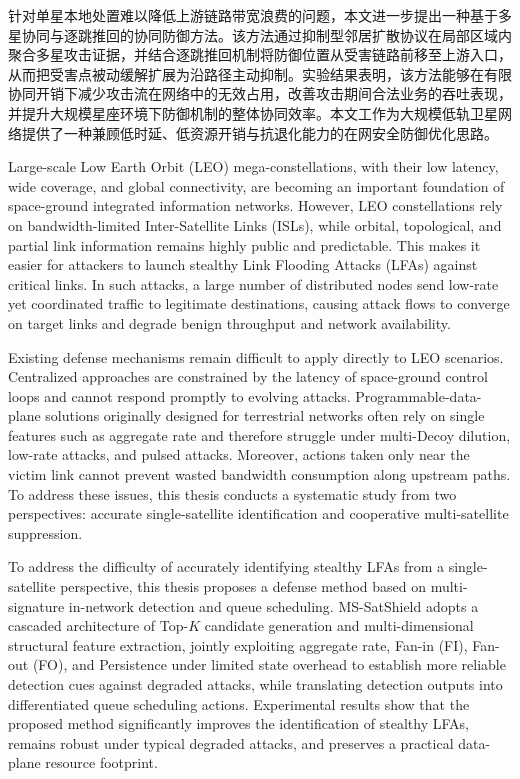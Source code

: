 \documentclass[print, master, vlined]{DissertUESTC}
\begin{document}
	针对单星本地处置难以降低上游链路带宽浪费的问题，本文进一步提出一种基于多星协同与逐跳推回的协同防御方法。该方法通过抑制型邻居扩散协议在局部区域内聚合多星攻击证据，并结合逐跳推回机制将防御位置从受害链路前移至上游入口，从而把受害点被动缓解扩展为沿路径主动抑制。实验结果表明，该方法能够在有限协同开销下减少攻击流在网络中的无效占用，改善攻击期间合法业务的吞吐表现，并提升大规模星座环境下防御机制的整体协同效率。本文工作为大规模低轨卫星网络提供了一种兼顾低时延、低资源开销与抗退化能力的在网安全防御优化思路。

	
	

	
	
	\enabstract
	
	Large-scale Low Earth Orbit (LEO) mega-constellations, with their low latency, wide coverage, and global connectivity, are becoming an important foundation of space-ground integrated information networks. However, LEO constellations rely on bandwidth-limited Inter-Satellite Links (ISLs), while orbital, topological, and partial link information remains highly public and predictable. This makes it easier for attackers to launch stealthy Link Flooding Attacks (LFAs) against critical links. In such attacks, a large number of distributed nodes send low-rate yet coordinated traffic to legitimate destinations, causing attack flows to converge on target links and degrade benign throughput and network availability.

	Existing defense mechanisms remain difficult to apply directly to LEO scenarios. Centralized approaches are constrained by the latency of space-ground control loops and cannot respond promptly to evolving attacks. Programmable-data-plane solutions originally designed for terrestrial networks often rely on single features such as aggregate rate and therefore struggle under multi-Decoy dilution, low-rate attacks, and pulsed attacks. Moreover, actions taken only near the victim link cannot prevent wasted bandwidth consumption along upstream paths. To address these issues, this thesis conducts a systematic study from two perspectives: accurate single-satellite identification and cooperative multi-satellite suppression.

	To address the difficulty of accurately identifying stealthy LFAs from a single-satellite perspective, this thesis proposes a defense method based on multi-signature in-network detection and queue scheduling. MS-SatShield adopts a cascaded architecture of Top-$K$ candidate generation and multi-dimensional structural feature extraction, jointly exploiting aggregate rate, Fan-in (FI), Fan-out (FO), and Persistence under limited state overhead to establish more reliable detection cues against degraded attacks, while translating detection outputs into differentiated queue scheduling actions. Experimental results show that the proposed method significantly improves the identification of stealthy LFAs, remains robust under typical degraded attacks, and preserves a practical data-plane resource footprint.
\end{document}
